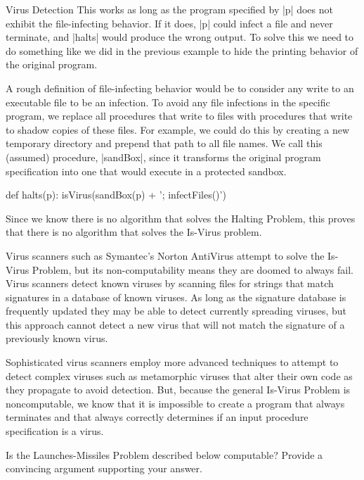 \begin{schemeregion}
\begin{exploration}{Virus Detection}
This works as long as the program specified by \pycode|p| does not exhibit the file-infecting behavior.  If it does, \pycode|p| could infect a file and never terminate, and \pycode|halts| would produce the wrong output.  To solve this we need to do something like we did in the previous example to hide the printing behavior of the original program.  

A rough definition of file-infecting behavior would be to consider any write to an executable file to be an infection.  To avoid any file infections in the specific program, we replace all procedures that write to files with procedures that write to shadow copies of these files.  For example, we could do this by creating a new temporary directory and prepend that path to all file names.  We call this (assumed) procedure, \pycode|sandBox|, since it transforms the original program specification into one that would execute in a protected sandbox.

\begin{pythoncode}
def halts(p): isVirus(sandBox(p) + '; infectFiles()')
\end{pythoncode}

Since we know there is no algorithm that solves the Halting Problem, this proves that there is no algorithm that solves the Is-Virus problem.

Virus scanners such as Symantec's Norton AntiVirus attempt to solve the Is-Virus Problem, but its non-computability means they are doomed to always fail.  Virus scanners detect known viruses by scanning files for strings that match signatures in a database of known viruses.  As long as the signature database is frequently updated they may be able to detect currently spreading viruses, but this approach cannot detect a new virus that will not match the signature of a previously known virus.  

Sophisticated virus scanners employ more advanced techniques to attempt to detect complex viruses such as metamorphic viruses that alter their own code as they propagate to avoid detection.  But, because the general Is-Virus Problem is noncomputable, we know that it is impossible to create a program that always terminates and that always correctly determines if an input procedure specification is a virus.

\par
\end{exploration}

\beforeex
\begin{exercise}
Is the Launches-Missiles Problem described below computable?  Provide a convincing argument supporting your answer.


\end{exercise}
\end{schemeregion}
